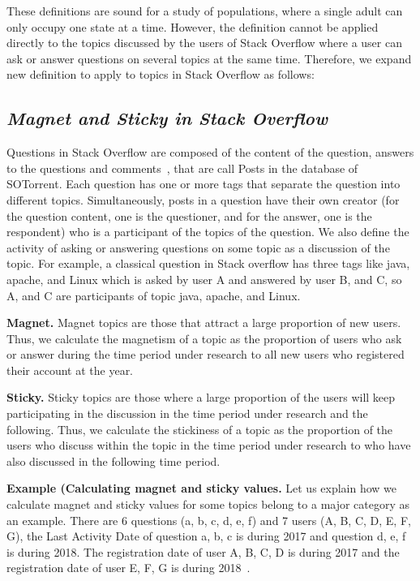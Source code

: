\documentclass[english,preprint,JIP]{ipsj}
\begin{document}
These definitions are sound for a study of populations, where a single adult can only occupy one state at a time. However, the definition cannot be applied directly to the topics discussed by the users of Stack Overflow where a user can ask or answer questions on several topics at the same time. Therefore, we expand new definition to apply to topics in Stack Overflow as follows:

\subsection*{\textit{\textbf{Magnet and Sticky in Stack Overflow}}}

Questions in Stack Overflow are composed of the content of the question, answers to the questions and comments~\cite{liu2018mining}, that are call Posts in the database of SOTorrent. Each question has one or more tags that separate the question into different topics. Simultaneously, posts in a question have their own creator (for the question content, one is the questioner, and for the answer, one is the respondent) who is a participant of the topics of the question. We also define the activity of asking or answering questions on some topic as a discussion of the topic. For example, a classical question in Stack overflow has three tags like java, apache, and Linux which is asked by user A and answered by user B, and C, so A, and C are participants of topic java, apache, and Linux.

\noindent
\textbf{Magnet.} Magnet topics are those that attract a large proportion of new users. Thus, we calculate the magnetism of a topic as the proportion of users who ask or answer during the time period under research to all new users who registered their account at the year.

\noindent
\textbf{Sticky.} Sticky topics are those where a large proportion of the users will keep participating in the discussion in the time period under research and the following. Thus, we calculate the stickiness of a topic as the proportion of the users who discuss within the topic in the time period under research to who have also discussed in the following time period.

\noindent
\textbf{Example (Calculating magnet and sticky values.}
Let us explain how we calculate magnet and sticky values for some topics belong to a major category as an example. There are 6 questions (a, b, c, d, e, f) and 7 users (A, B, C, D, E, F, G), the Last Activity Date of question a, b, c is during 2017 and question d, e, f is during 2018. The registration date of user A, B, C, D is during 2017 and the registration date of user E, F, G is during 2018~\cite{yamashita2016magnet}.
\end{document}
